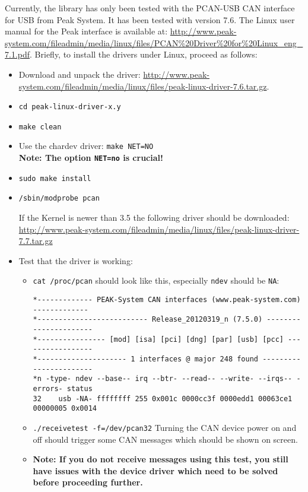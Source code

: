 Currently, the library has only been tested with the PCAN-USB CAN interface for USB from Peak System. It has been tested with version 7.6. The Linux user manual for the Peak interface is available at: \url{http://www.peak-system.com/fileadmin/media/linux/files/PCAN%20Driver%20for%20Linux_eng_7.1.pdf}. Briefly, to install the drivers under Linux, proceed as follows:
  \begin{itemize}
  \item Download and unpack the driver: \url{http://www.peak-system.com/fileadmin/media/linux/files/peak-linux-driver-7.6.tar.gz}.
  \item \texttt{cd peak-linux-driver-x.y}
  \item \texttt{make clean}
  \item Use the chardev driver: \texttt{make NET=NO}\\
    {\bf Note: The option \texttt{NET=no} is crucial!}
  \item \texttt{sudo make install}
  \item \texttt{/sbin/modprobe pcan}
  
  If the Kernel is newer than 3.5 the following driver should be downloaded:
  \url{http://www.peak-system.com/fileadmin/media/linux/files/peak-linux-driver-7.7.tar.gz}

  \item Test that the driver is working:
    \begin{itemize}
    \item \texttt{cat /proc/pcan} should look like this, especially \texttt{ndev} should be \texttt{NA}:
      {\scriptsize
\begin{verbatim}
*------------- PEAK-System CAN interfaces (www.peak-system.com) -------------
*-------------------------- Release_20120319_n (7.5.0) ----------------------
*---------------- [mod] [isa] [pci] [dng] [par] [usb] [pcc] -----------------
*--------------------- 1 interfaces @ major 248 found -----------------------
*n -type- ndev --base-- irq --btr- --read-- --write- --irqs-- -errors- status
32    usb -NA- ffffffff 255 0x001c 0000cc3f 0000edd1 00063ce1 00000005 0x0014
\end{verbatim}}
\item \texttt{./receivetest -f=/dev/pcan32} Turning the CAN device power on and off should trigger some CAN messages which should be shown on screen.
\item {\bf Note: If you do not receive messages using this test, you still have issues with the device driver which need to be solved before proceeding further.}
    \end{itemize}
  \end{itemize}

